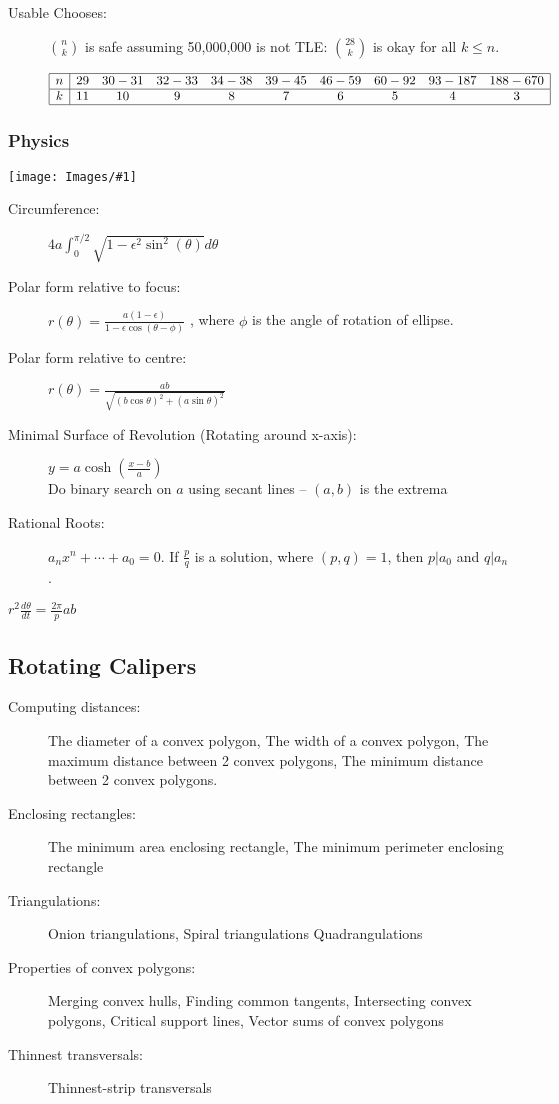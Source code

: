\documentclass[landscape,10pt]{article}
\newcommand{\myimage}[2]{\begin{center}\texttt{[image: Images/\#1]}\end{center}}
\begin{document}
\begin{multicols*}{2}
\begin{description}
\item[Usable Chooses:] $\binom{n}{k}$ is safe assuming 50,000,000 is not TLE: $\binom{28}{k}$ is okay for all $k \leq n$.

\hskip-20pt
$
\begin{array}{|c|ccccccccc|}
 \hline
 n & 29 & 30-31 & 32-33 & 34-38 & 39-45 & 46-59 & 60-92 & 93-187 & 188-670 \\ \hline
 k & 11 & 10 & 9 & 8 & 7 & 6 & 5 & 4 & 3 \\\hline
\end{array}
$
\end{description}

\subsubsection{Physics}

\myimage{Ellipse.jpg}{1.25in}

\begin{description}
 \item[Circumference:] $4a\int_0^{\pi/2}\sqrt{1-\epsilon^2\sin^2(\theta)} d\theta$
 \item[Polar form relative to focus:] $r(\theta) = \frac{a(1-\epsilon)}{1-\epsilon\cos(\theta-\phi)}$ , where $\phi$ is the angle of rotation of ellipse.
 \item[Polar form relative to centre:] $r(\theta) = \frac{ab}{\sqrt{(b\cos\theta)^2+(a\sin\theta)^2}}$
 \item[Minimal Surface of Revolution (Rotating around x-axis):] $y=a\cosh(\frac{x-b}{a})$ \\ Do binary search on $a$ using secant lines -- $(a,b)$ is the extrema
\item[Rational Roots:] $a_nx^n + \cdots + a_0 = 0$. If $\frac{p}{q}$ is a solution, where $(p,q)=1$, then $p | a_0$ and $q | a_n$.
\end{description}

$r^2\frac{d\theta}{dt} = \frac{2\pi}{p} ab$

\subsection{Rotating Calipers}

\begin{description}
\item[Computing distances:]
The diameter of a convex polygon, The width of a convex polygon, The maximum distance between 2 convex polygons, The minimum distance between 2 convex polygons.
\item[Enclosing rectangles:]
The minimum area enclosing rectangle, The minimum perimeter enclosing rectangle
\item[Triangulations:]
Onion triangulations, Spiral triangulations Quadrangulations
\item[Properties of convex polygons:]
Merging convex hulls, Finding common tangents, Intersecting convex polygons, Critical support lines, Vector sums of convex polygons
\item[Thinnest transversals:]
Thinnest-strip transversals
\end{description}


\end{multicols*}
\end{document}

